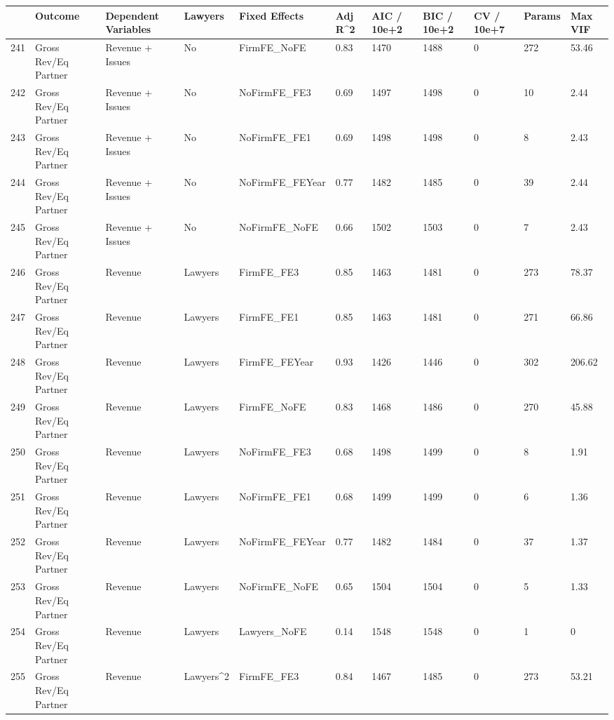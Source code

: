 \begin{table}[ht]
\centering
\begin{tabular}{rllllllllll}
  \hline
 & Outcome & Dependent Variables & Lawyers & Fixed Effects & Adj R^2 & AIC / 10e+2 & BIC / 10e+2 & CV / 10e+7 & Params & Max VIF \\ 
  \hline
241 & Gross Rev/Eq Partner & Revenue + Issues & No & FirmFE\_NoFE & 0.83 & 1470 & 1488 & 0 & 272 & 53.46 \\ 
  242 & Gross Rev/Eq Partner & Revenue + Issues & No & NoFirmFE\_FE3 & 0.69 & 1497 & 1498 & 0 & 10 & 2.44 \\ 
  243 & Gross Rev/Eq Partner & Revenue + Issues & No & NoFirmFE\_FE1 & 0.69 & 1498 & 1498 & 0 & 8 & 2.43 \\ 
  244 & Gross Rev/Eq Partner & Revenue + Issues & No & NoFirmFE\_FEYear & 0.77 & 1482 & 1485 & 0 & 39 & 2.44 \\ 
  245 & Gross Rev/Eq Partner & Revenue + Issues & No & NoFirmFE\_NoFE & 0.66 & 1502 & 1503 & 0 & 7 & 2.43 \\ 
  246 & Gross Rev/Eq Partner & Revenue & Lawyers & FirmFE\_FE3 & 0.85 & 1463 & 1481 & 0 & 273 & 78.37 \\ 
  247 & Gross Rev/Eq Partner & Revenue & Lawyers & FirmFE\_FE1 & 0.85 & 1463 & 1481 & 0 & 271 & 66.86 \\ 
  248 & Gross Rev/Eq Partner & Revenue & Lawyers & FirmFE\_FEYear & 0.93 & 1426 & 1446 & 0 & 302 & 206.62 \\ 
  249 & Gross Rev/Eq Partner & Revenue & Lawyers & FirmFE\_NoFE & 0.83 & 1468 & 1486 & 0 & 270 & 45.88 \\ 
  250 & Gross Rev/Eq Partner & Revenue & Lawyers & NoFirmFE\_FE3 & 0.68 & 1498 & 1499 & 0 & 8 & 1.91 \\ 
  251 & Gross Rev/Eq Partner & Revenue & Lawyers & NoFirmFE\_FE1 & 0.68 & 1499 & 1499 & 0 & 6 & 1.36 \\ 
  252 & Gross Rev/Eq Partner & Revenue & Lawyers & NoFirmFE\_FEYear & 0.77 & 1482 & 1484 & 0 & 37 & 1.37 \\ 
  253 & Gross Rev/Eq Partner & Revenue & Lawyers & NoFirmFE\_NoFE & 0.65 & 1504 & 1504 & 0 & 5 & 1.33 \\ 
  254 & Gross Rev/Eq Partner & Revenue & Lawyers & Lawyers\_NoFE & 0.14 & 1548 & 1548 & 0 & 1 & 0 \\ 
  255 & Gross Rev/Eq Partner & Revenue & Lawyers^2 & FirmFE\_FE3 & 0.84 & 1467 & 1485 & 0 & 273 & 53.21 \\ 

\end{tabular}
\end{table}
